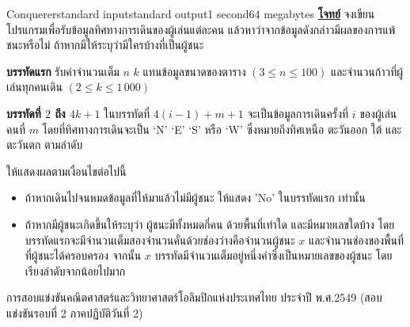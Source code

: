 \documentclass[11pt,a4paper]{article}
\begin{document}
\begin{problem}{Conquerer}{standard input}{standard output}{1 second}{64 megabytes}
\bigskip
\underline{\textbf{โจทย์}}  จงเขียนโปรแกรมเพื่อรับข้อมูลทิศทางการเดินของผู้เล่นแต่ละคน แล้วหาว่าจากข้อมูลดังกล่าวมีผลของการแพ้ชนะหรือไม่ ถ้าหากมีให้ระบุว่ามีใครบ้างที่เป็นผู้ชนะ

\InputFile

\textbf{บรรทัดแรก} รับค่าจำนวนเต็ม $n$ $k$ แทนข้อมูลขนาดของตาราง $(3 \leq n \leq 100)$ และจำนวนก้าวที่ผู้เล่นทุกคนเดิน $(2 \leq k \leq 1\,000)$

\textbf{บรรทัดที่ $2$ ถึง $4k+1$} ในบรรทัดที่ $4(i-1) + m + 1$ จะเป็นข้อมูลการเดินครั้งที่ $i$ ของผู้เล่นคนที่ $m$ โดยที่ทิศทางการเดินจะเป็น ‘N’ ‘E’ ‘S’ หรือ ‘W’ ซึ่งหมายถึงทิศเหนือ ตะวันออก ใต้ และ ตะวันตก ตามลำดับ

\OutputFile

ให้แสดงผลตามเงื่อนไขต่อไปนี้
\begin{itemize}

\item ถ้าหากเดินไปจนหมดข้อมูลที่ให้มาแล้วไม่มีผู้ชนะ ให้แสดง 'No' ในบรรทัดแรก เท่านั้น
\item ถ้าหากมีผู้ชนะเกิดขึ้นให้ระบุว่า ผู้ชนะมีทั้งหมดกี่คน ด้วยพื้นที่เท่าใด และมีหมายเลขใดบ้าง โดยบรรทัดแรกจะมีจำนวนเต็มสองจำนวนคั่นด้วยช่องว่างคือจำนวนผู้ชนะ $x$ และจำนวนช่องของพื้นที่ที่ผู้ชนะได้ครอบครอง จากนั้น $x$ บรรทัดมีจำนวนเต็มอยู่หนึ่งค่าซึ่งเป็นหมายเลขของผู้ชนะ โดยเรียงลำดับจากน้อยไปมาก
\end{itemize}

\Examples

\begin{example}
%
\end{example}


\Source

การสอบแข่งขันคณิตศาสตร์และวิทยาศาสตร์โอลิมปิกแห่งประเทศไทย
ประจำปี พ.ศ.2549 (สอบแข่งขันรอบที่ 2 ภาคปฏิบัติวันที่ 2)

\end{problem}
\end{document}

